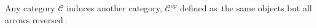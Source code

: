 Any category $\mathcal{C}$ induces another category, $\mathcal{C}^{op}$ defined as \,the same objects but all arrows reversed\,.
